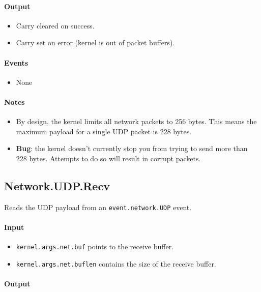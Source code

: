 \paragraph{Output}

\begin{itemize}
\item Carry cleared on success.
\item Carry set on error (kernel is out of packet buffers).
\end{itemize}

\paragraph{Events}

\begin{itemize}
\item None
\end{itemize}

\paragraph{Notes}

\begin{itemize}
\item By design, the kernel limits all network packets to 256 bytes.  This means the maximum payload for a single UDP packet is 228 bytes.
\item {\bf Bug}: the kernel doesn't currently stop you from trying to send more than 228 bytes.  Attempts to do so will result in corrupt packets.
\end{itemize}

\subsection*{Network.UDP.Recv}
Reads the UDP payload from an \verb+event.network.UDP+ event.

\paragraph{Input}

\begin{itemize}
\item \verb+kernel.args.net.buf+ points to the receive buffer.
\item \verb+kernel.args.net.buflen+ contains the size of the receive buffer.
\end{itemize}

\paragraph{Output}


